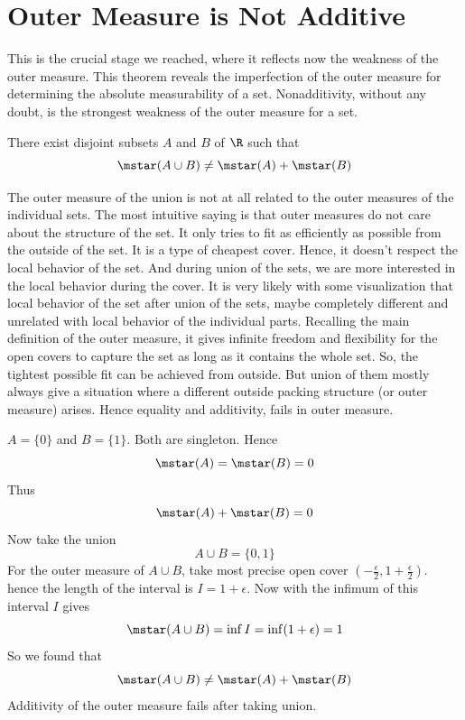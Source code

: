  \section{Outer Measure is Not Additive}
    This is the crucial stage we reached, where it reflects now the weakness of the outer measure. This theorem reveals the imperfection of the outer measure for determining the absolute measurability of a set. Nonadditivity, without any doubt, is the strongest weakness of the outer measure for a set. 
    \begin{theorem}
        There exist disjoint subsets $A$ and $B$ of $\R$ such that
    \[
    \mstar(A\cup B) \neq \mstar(A) + \mstar(B)
    \]
    \end{theorem}
    \begin{concept}
        The outer measure of the union is not at all related to the outer measures of the individual sets. The most intuitive saying is that outer measures do not care about the structure of the set. It only tries to fit as efficiently as possible from the outside of the set. It is a type of cheapest cover. Hence, it doesn't respect the local behavior of the set. And during union of the sets, we are more interested in the local behavior during the cover. It is very likely with some visualization that local behavior of the set after union of the sets, maybe completely different and unrelated with local behavior of the individual parts. Recalling the main definition of the outer measure, it gives infinite freedom and flexibility for the open covers to capture the set as long as it contains the whole set. So, the tightest possible fit can be achieved from outside. But union of them mostly always give a situation where a different outside packing structure (or outer measure) arises. Hence equality and additivity, fails in outer measure. 
    \end{concept}
    \begin{example}
        $A=\{0\}$ and $B=\{1\}$. Both are singleton. Hence 
        \[
        \mstar(A) = \mstar(B) = 0
        \]
        Thus
        \[
        \mstar(A) + \mstar(B) = 0
        \]
        Now take the union
        \[
        A \cup B = \{0, 1\}
        \]
        For the outer measure of $A \cup B$, take most precise open cover $(-\frac{\epsilon}{2}, 1+\frac{\epsilon}{2})$. hence the length of the interval is $I =1+ \epsilon$. Now with the infimum of this interval $I$ gives
        \[
        \mstar(A\cup B) = \inf I =\inf (1+\epsilon)=1
        \]
        So we found that
        \[
        \mstar(A \cup B) \neq \mstar(A) + \mstar(B)
        \]
        Additivity of the outer measure fails after taking union. 
    \end{example}